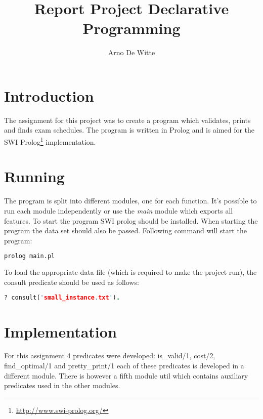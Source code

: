 \documentclass[11pt]{article}
\title{Report Project Declarative Programming}
\author{Arno De Witte}
\date{}
\begin{document}
\maketitle

\section{Introduction}
The assignment for this project was to create a program which validates, prints and finds exam schedules. The program is written in Prolog and is aimed for the SWI Prolog\footnote{\url{http://www.swi-prolog.org/}} implementation.

\section{Running}
The program is split into different modules, one for each function. It's possible to run each module independently or use the \emph{main} module which exports all features. To start the program SWI prolog should be installed. When starting the program the data set should also be passed. Following command will start the program:

\begin{lstlisting}[language=bash]
prolog main.pl
\end{lstlisting}
To load the appropriate data file (which is required to make the project run), the consult predicate should be used as follows:

\begin{lstlisting}[language=prolog]
? consult('small_instance.txt').
\end{lstlisting}

\section{Implementation}
For this assignment 4 predicates were developed: is\_valid/1, cost/2, find\_optimal/1 and pretty\_print/1 each of these predicates is developed in a different module. There is however a fifth module util which contains auxiliary predicates used in the other modules.
\end{document}
